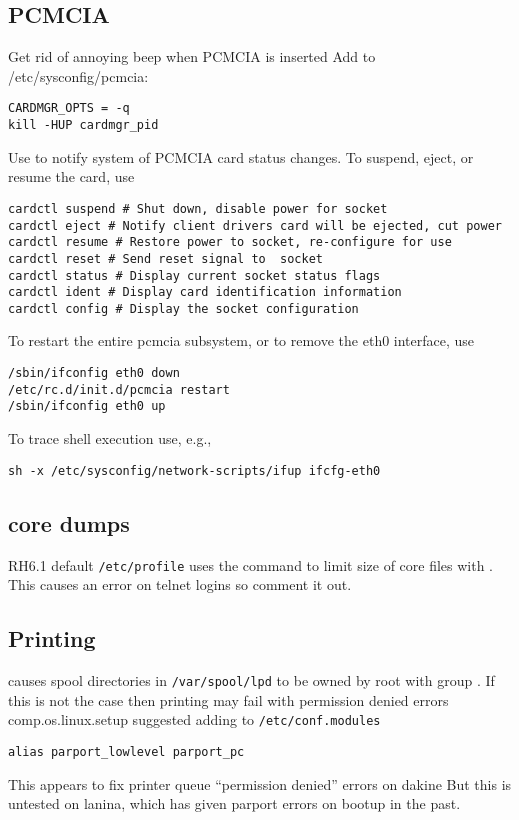 \documentclass[12pt,twoside]{article}
\begin{document}
\subsection{PCMCIA}\label{sxn:pcmcia2}
Get rid of annoying beep when PCMCIA is inserted
Add to /etc/sysconfig/pcmcia:
\begin{verbatim}
CARDMGR_OPTS = -q 
kill -HUP cardmgr_pid
\end{verbatim}
Use  to notify system of PCMCIA card status changes.
To suspend, eject, or resume the card, use
\begin{verbatim}
cardctl suspend # Shut down, disable power for socket
cardctl eject # Notify client drivers card will be ejected, cut power
cardctl resume # Restore power to socket, re-configure for use
cardctl reset # Send reset signal to  socket
cardctl status # Display current socket status flags
cardctl ident # Display card identification information
cardctl config # Display the socket configuration
\end{verbatim}
To restart the entire pcmcia subsystem, or to remove the eth0 interface, use
\begin{verbatim}
/sbin/ifconfig eth0 down
/etc/rc.d/init.d/pcmcia restart
/sbin/ifconfig eth0 up
\end{verbatim}
To trace shell execution use, e.g.,
\begin{verbatim}
sh -x /etc/sysconfig/network-scripts/ifup ifcfg-eth0
\end{verbatim}

\subsection{core dumps}\label{sxn:core}
RH6.1 default \verb'/etc/profile' uses the  command 
to limit size of core files with . 
This causes an error on telnet logins so comment it out.

\subsection{Printing}\label{sxn:prn}
 causes spool directories in \verb'/var/spool/lpd' to
be owned by root with group .
If this is not the case then printing may fail with permission denied errors
comp.os.linux.setup suggested adding to \verb'/etc/conf.modules'
\begin{verbatim}
alias parport_lowlevel parport_pc
\end{verbatim}
This appears to fix printer queue ``permission denied'' errors on dakine
But this is untested on lanina, which has given parport errors on
bootup in the past.
\end{document}
